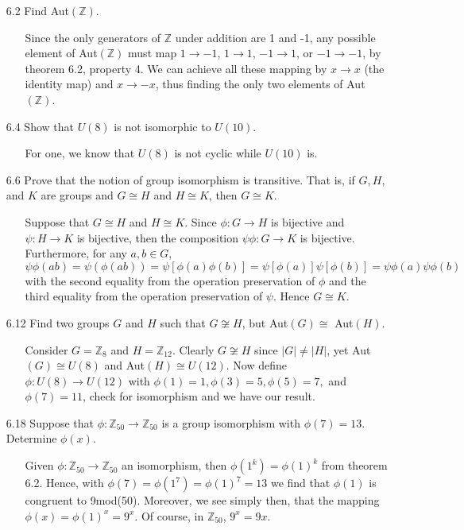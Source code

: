 \documentclass[12pt]{article}
\begin{document}
\begin{enumerate}
\item[6.2] Find Aut$(\mathbb{Z})$.
\begin{enumerate}
\item[] Since the only generators of $\mathbb{Z}$ under addition are 1 and -1, 
any possible element of Aut$(\mathbb{Z})$ must map $1 \rightarrow -1$, $1 \rightarrow 1$,
$-1 \rightarrow 1$, or $-1 \rightarrow -1$, by theorem 6.2, property 4. 
We can achieve all these mapping by $x \rightarrow x$ (the identity map) and $x \rightarrow -x$, 
thus finding the only two elements of Aut$(\mathbb{Z})$. 
\end{enumerate}

\item[6.4] Show that $U(8)$ is not isomorphic to $U(10)$.
\begin{enumerate}
\item[] For one, we know that $U(8)$ is not cyclic while $U(10)$ is.
\end{enumerate}

\item[6.6] Prove that the notion of group isomorphism is transitive. That is, if $G, H,$ and
$K$ are groups and $G \cong H$ and $H \cong K$, then $G \cong K$.
\begin{enumerate}
\item[ ] Suppose that $G \cong H$ and $H \cong K$. Since 
$\phi: G \rightarrow H$ is bijective and $\psi: H \rightarrow K$ is bijective, 
then the composition $\psi\phi: G \rightarrow K$ is bijective. Furthermore,  for any $a, b \in G$, 
\[
\psi\phi(ab) = \psi(\phi(ab)) = \psi[\phi(a)\phi(b)] = \psi[\phi(a)]\psi[\phi(b)]
= \psi\phi(a)\psi\phi(b)
\]
with the second equality from the operation preservation of $\phi$ and the third equality
from the operation preservation of $\psi$. Hence $G \cong K$.
\end{enumerate}

\item[6.12] Find two groups $G$ and $H$ such that $G \not\cong H$, but Aut$(G) \cong $ Aut$(H)$.
\begin{enumerate}
\item[] Consider $G = \mathbb{Z}_8$ and $H = \mathbb{Z}_{12}$. Clearly 
$G \not\cong H$ since $|G| \neq |H|$, yet Aut$(G) \cong U(8)$ and Aut$(H) \cong U(12)$. Now define
$\phi: U(8) \rightarrow U(12)$ with $\phi(1) = 1, \phi(3) = 5, \phi(5) = 7,$ and $\phi(7) = 11$, check
for isomorphism and we have our result.
\end{enumerate}

\item[6.18] Suppose that $\phi: \mathbb{Z}_{50} \rightarrow \mathbb{Z}_{50}$ is a group
isomorphism with $\phi(7) = 13$. Determine $\phi(x)$.
\begin{enumerate}
\item[] Given $\phi : \mathbb{Z}_{50} \to \mathbb{Z}_{50}$ an isomorphism, then $\phi(1^{k}) = \phi(1)^{k}$
from theorem 6.2.
Hence, with $\phi(7) = \phi(1^7) = \phi(1)^{7} = 13$ we find that $\phi(1)$ is congruent to 9mod(50). 
Moreover, we see simply then, that the mapping $\phi(x) = \phi(1)^{x} = 9^{x}$. Of course,
in $\mathbb{Z}_{50}$, $9^{x} = 9x$.
\end{enumerate}


\end{enumerate}
\end{document}
